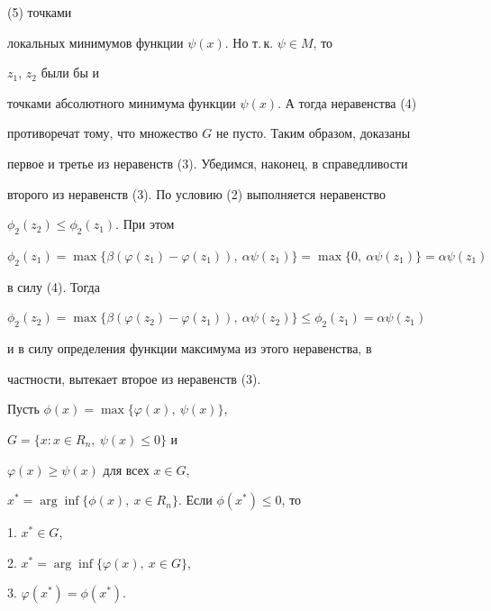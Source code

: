 \begin{pf}
(5) точками 


локальных минимумов функции $\psi(x)$. Но т.\,к.{} $\psi\in M$, то 


$z_1$, $z_2$ были бы и 


точками абсолютного минимума функции $\psi(x)$. А тогда неравенства (4) 


противоречат тому, что множество $G$ не пусто. Таким образом, доказаны 


первое и третье из неравенств (3). Убедимся, наконец, в справедливости 


второго из неравенств (3). По условию (2) выполняется неравенство 


$\phi_2(z_2)\le\phi_2(z_1)$. При этом 


$\phi_2(z_1)=\max\{\beta(\varphi(z_1)-\varphi(z_1)),\ \alpha\psi(z_1)\}= 


\max\{0,\ \alpha\psi(z_1)\}=\alpha\psi(z_1)$ 


в силу (4). Тогда 


$\phi_2(z_2)=\max\{\beta(\varphi(z_2)-\varphi(z_1)),\ \alpha\psi(z_2) 


\}\le\phi_2(z_1)=\alpha\psi(z_1)$ 


и в силу определения функции максимума из этого неравенства, в  


частности, вытекает второе из неравенств (3). 


\end{pf} 


 


\begin{cornonum} 


Пусть $\phi(x)=\max\{\varphi(x),\ \psi(x)\}$, 


$G=\{x:x\in R_n,\ \psi(x)\le 0\}$ и 


$\varphi(x)\ge\psi(x)$ для всех $x\in G$, 


$x^*=\arg\inf\{\phi(x),\ x\in R_n\}$. Если $\phi(x^*)\le 0$, то 


 


1. $x^*\in G$, 


 


2. $x^*=\arg\inf\{\varphi(x),\ x\in G\}$, 


 


3. $\varphi(x^*)=\phi(x^*)$. 


\end{cornonum} 


